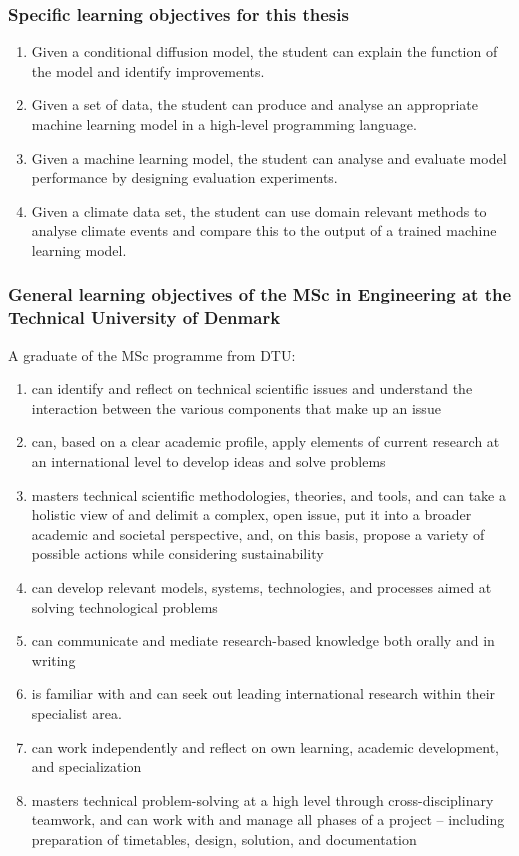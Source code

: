 \documentclass[11pt,a4paper]{article}
\begin{document}
\subsubsection*{Specific learning objectives for this thesis}
\begin{enumerate}
    \item Given a conditional diffusion model, the student can explain the function of the model and identify improvements. 
    \item Given a set of data, the student can produce and analyse an appropriate machine learning model in a high-level programming language. 
    \item Given a machine learning model, the student can analyse and evaluate model performance by designing evaluation experiments.
    \item Given a climate data set, the student can use domain relevant methods to analyse climate events and compare this to the output of a trained machine learning model.
\end{enumerate}

\subsubsection*{General learning objectives of the MSc in Engineering at the Technical University of Denmark}
A graduate of the MSc programme from DTU:
\begin{enumerate}
    \item can identify and reflect on technical scientific issues and understand the interaction between the various components that make up an issue
    \item can, based on a clear academic profile, apply elements of current research at an international level to develop ideas and solve problems
    \item masters technical scientific methodologies, theories, and tools, and can take a holistic view of and delimit a complex, open issue, put it into a broader academic and societal perspective, and, on this basis, propose a variety of possible actions while considering sustainability
    \item can develop relevant models, systems, technologies, and processes aimed at solving technological problems
    \item can communicate and mediate research-based knowledge both orally and in writing
    \item is familiar with and can seek out leading international research within their specialist area.
    \item can work independently and reflect on own learning, academic development, and specialization
    \item masters technical problem-solving at a high level through cross-disciplinary teamwork, and can work with and manage all phases of a project – including preparation of timetables, design, solution, and documentation
\end{enumerate}
\end{document}
